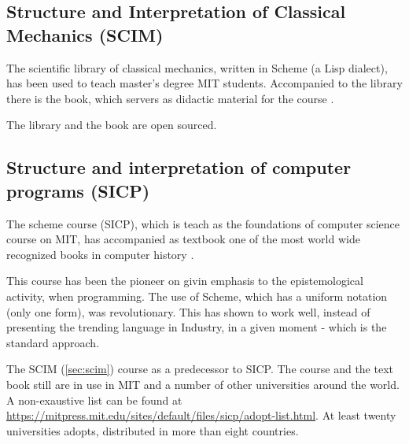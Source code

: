 \documentclass[
12pt,				%
openright,			%
oneside,			%
a4paper,			%
brazil,				%
english,			%
]{abntex2}
\begin{document}
\subsection{Structure and Interpretation of Classical Mechanics (SCIM)}
\label{sec:scim}
The scientific library of classical mechanics, written in Scheme (a
Lisp dialect), has been used to teach master's degree MIT
students. Accompanied to the library there is the book, which servers
as didactic material for the course \cite{sussman2015structure}.

The library and the book are open sourced.

\subsection{Structure and interpretation of computer programs (SICP)}
The scheme course (SICP), which is teach as the foundations of
computer science course on MIT, has accompanied as textbook one of the
most world wide recognized books in computer history
\cite{abelson1996structure}.

This course has been the pioneer on givin emphasis to the
epistemological activity, when programming. The use of Scheme, which
has a uniform notation (only one form), was revolutionary. This has
shown to work well, instead of presenting the trending language
in Industry, in a given moment - which is the standard approach.  

The SCIM (\autoref{sec:scim}) course as a predecessor to SICP. The course and
the text book still are in use in MIT and a number of other
universities around the world. A non-exaustive list can be found at
\url{https://mitpress.mit.edu/sites/default/files/sicp/adopt-list.html}. At
least twenty universities adopts, distributed in more than eight countries.
\end{document}

